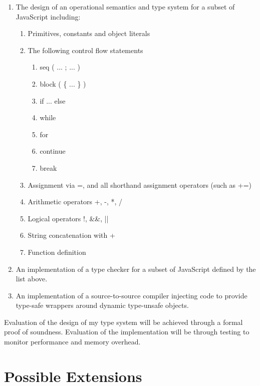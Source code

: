\documentclass{article}
\begin{document}
		\begin{enumerate} 
			\item The design of an operational semantics and type system for a
			  subset of JavaScript including: 

			\begin{enumerate}

				\item Primitives, constants and object literals  
				\item The following control flow statements   
				\begin{enumerate}    
					\item seq ( ... ; ... )   
					\item block ( \{ ... \} )    
					\item if ... else    
					\item while    
					\item for     
					\item continue    
					\item break    
				\end{enumerate}  
				\item Assignment via =, and all shorthand assignment operators (such as +=)  
				\item Arithmetic operators +, -, *, /  
				\item Logical operators !, \&\&, ||  
				\item String concatenation with +  
				\item Function definition 
			\end{enumerate} 
			
			\item An implementation of a type checker for a subset of
			  JavaScript defined by the list above. 

			\item An implementation of a source-to-source compiler injecting
			  code to provide type-safe wrappers around dynamic type-unsafe
			  objects.
		  \end{enumerate}

		Evaluation of the design of my type system will be achieved through a
		formal proof of soundness. Evaluation of the implementation will be
		through testing to monitor performance and memory overhead.

	\section{Possible Extensions}\label{prop-possible-extensions}
\end{document}

